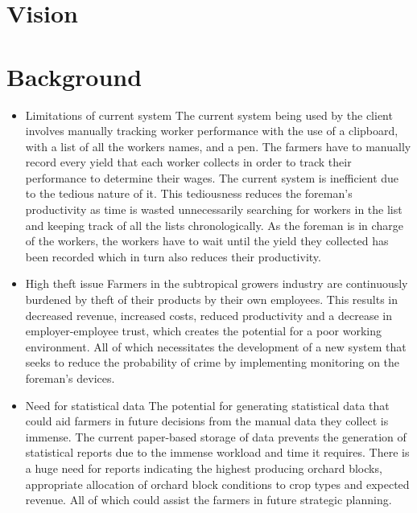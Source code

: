 \documentclass[11pt,fleqn]{book} %
\begin{document}

\chapter{Vision}



\chapter{Background}
\begin{itemize}
	\item Limitations of current system\newline\newline
	The current system being used by the client involves manually tracking worker performance with the use of a clipboard, with a list of all the workers names, and a pen.  The farmers have to manually record every yield that each worker collects in order to track their performance to determine their wages. The current system is inefficient due to the tedious nature of it. This tediousness reduces the foreman’s productivity as time is wasted unnecessarily searching for workers in the list and keeping track of all the lists chronologically. As the foreman is in charge of the workers, the workers have to wait until the yield they collected has been recorded which in turn also reduces their productivity.\newline
	
	\item High theft issue\newline\newline
	Farmers in the subtropical growers industry are continuously burdened by theft of their products by their own employees. This results in decreased revenue, increased costs, reduced productivity and a decrease in employer-employee trust, which creates the potential for a poor working environment. All of which necessitates the development of a new system that seeks to reduce the probability of crime by implementing monitoring on the foreman’s devices.\newline
	
	\item Need for statistical data\newline\newline
	The potential for generating statistical data that could aid farmers in future decisions from the manual data they collect is immense. The current paper-based storage of data prevents the generation of statistical reports due to the immense workload and time it requires. There is a huge need for reports indicating the highest producing orchard blocks, appropriate allocation of orchard block conditions to crop types and expected revenue. All of which could assist the farmers in future strategic planning.
\end{itemize}
\end{document}
